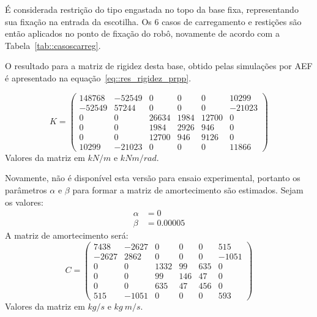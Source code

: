 É considerada restrição do tipo engastada no topo da base fixa, representando
sua fixação na entrada da escotilha. Os 6 casos de carregamento e restições são
então aplicados no ponto de fixação do robô, novamente de acordo com a
Tabela~\ref{tab::casoscarreg}.

O resultado para a matriz de rigidez desta base, obtido pelas simulações por
AEF é apresentado na equação~\ref{eq::res_rigidez_prpp}.

%
\begin{equation} \label{eq::res_rigidez_prpp}
	K = 
\begin{pmatrix}
148768	&	-52549	&	0	&	0	&	0	&	10299 \\
-52549	&	57244	&	0	&	0	&	0	&	-21023 \\
0	&	0	&	26634	&	1984	&	12700	&	0 \\
0	&	0	&	1984	&	2926	&	946	&	0 \\
0	&	0	&	12700	&	946	&	9126	&	0 \\
10299	&	-21023	&	0	&	0	&	0	&	11866
\end{pmatrix}
\end{equation}
%
Valores da matriz em $kN/m$ e $kNm/rad$.

Novamente, não é disponível esta versão para ensaio experimental, portanto os
parâmetros $\alpha$ e $\beta$ para formar a matriz de amortecimento são
estimados.
Sejam os valores:
%
\begin{align*}
	\alpha &= 0 \\
	\beta &= 0.00005
\end{align*}
%
A matriz de amortecimento será:
%
\begin{equation} \label{eq::res_amortecimento_prpp}
	C = 
\begin{pmatrix}
7438	&	-2627	&	0	&	0	&	0	&	515 \\
-2627	&	2862	&	0	&	0	&	0	&	-1051 \\
0	&	0	&	1332	&	99	&	635	&	0 \\
0	&	0	&	99	&	146	&	47	&	0 \\
0	&	0	&	635	&	47	&	456	&	0 \\
515	&	-1051	&	0	&	0	&	0	&	593
\end{pmatrix}
\end{equation}
%
Valores da matriz em $kg/s$ e $kg~m/s$.

